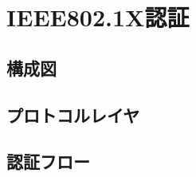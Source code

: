 \section{IEEE802.1X認証}
\toc
\subsection{構成図}
\begin{frame}{\ft}
    
\end{frame}
\subsection{プロトコルレイヤ}
\begin{frame}{\ft}
    
\end{frame}
\subsection{認証フロー}
\begin{frame}{\ft}
    
\end{frame}